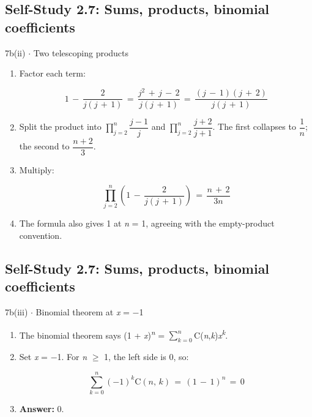 \documentclass[11pt]{article}
\begin{document}
\begin{keepsection}\subsection{Self-Study 2.7: Sums, products, binomial coefficients}

\begin{workedbox}{7b(ii) \ensuremath{\cdot} Two telescoping products}
\begin{enumerate}
\item {}
Factor each term:

\begin{equation*}1\, -\, \dfrac{2}{{j}({j}\, +\, 1)}\, =\, \dfrac{{j}^{2}\, +\, {j}\, -\, 2}{{j}({j}\, +\, 1)}\, =\, \dfrac{({j}\, -\, 1)({j}\, +\, 2)}{{j}({j}\, +\, 1)}\end{equation*}
\item Split the product into $\prod_{{j}=2}^{{n}} ${\small\ensuremath{\dfrac{{j}-1}{{j}}}} and $\prod_{{j}=2}^{{n}} ${\small\ensuremath{\dfrac{{j}+2}{{j}+1}}}. The first collapses to {\small\ensuremath{\dfrac{1}{{n}}}}; the second to {\small\ensuremath{\dfrac{{n}+2}{3}}}.
\item {}
Multiply:

\begin{equation*}\prod_{{j}=2}^{{n}} \left(1\, -\, \dfrac{2}{{j}({j}\, +\, 1)}\right)\, =\, \dfrac{{n}\, +\, 2}{3{n}}\end{equation*}
\item The formula also gives 1 at \textit{n} = 1, agreeing with the empty-product convention.
\end{enumerate}
\end{workedbox}

\end{keepsection}
\begin{keepsection}\subsection{Self-Study 2.7: Sums, products, binomial coefficients}

\begin{workedbox}{7b(iii) \ensuremath{\cdot} Binomial theorem at \textit{x} = \ensuremath{-}1}
\begin{enumerate}
\item The binomial theorem says (1 + \textit{x})\textsuperscript{\textit{n}} = $\sum_{{k}=0}^{{n}} $C(\textit{n},\textit{k})\textit{x}\textsuperscript{\textit{k}}.
\item {}
Set \textit{x} = \ensuremath{-}1. For \textit{n} \ensuremath{\geq} 1, the left side is 0, so:

\begin{equation*}\sum_{{k}=0}^{{n}} (-1)^{{k}}\mathrm{C}({n},\, {k})\, =\, (1\, -\, 1)^{{n}}\, =\, 0\end{equation*}
\item \textbf{Answer:} 0.
\end{enumerate}
\end{workedbox}

\end{keepsection}
\end{document}
